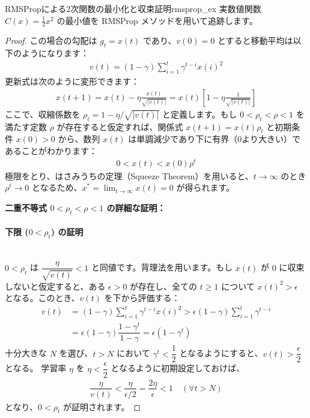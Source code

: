 \documentclass[dvipdfmx,a4paper,11pt]{jsarticle}
\begin{document}
\begin{reidai}{RMSPropによる2次関数の最小化と収束証明}{rmsprop_ex}
実数値関数 $C(x) = \frac{1}{2}x^2$ の最小値を RMSProp メソッドを用いて追跡します。
\end{reidai}
\begin{proof}
この場合の勾配は $g_t = x(t)$ であり、$v(0) = 0$ とすると移動平均は以下のようになります：
\begin{align*}
    v(t) = (1 - \gamma) \sum_{i=1}^t \gamma^{t-i}x(i)^2
\end{align*}
更新式は次のように変形できます：
\begin{align*}
    x(t + 1) = x(t) - \eta \frac{x(t)}{\sqrt{|v(t)|}} = x(t)\left[1 - \eta \frac{1}{\sqrt{|v(t)|}}\right]
\end{align*}
ここで、収縮係数を $\rho_t = 1 - \eta / \sqrt{|v(t)|}$ と定義します。もし $0 < \rho_t < \rho < 1$ を満たす定数 $\rho$ が存在すると仮定すれば、関係式 $x(t+1) = x(t)\rho_t$ と初期条件 $x(0) > 0$ から、数列 $x(t)$ は単調減少であり下に有界（0より大きい）であることがわかります：
\begin{align*}
    0 < x(t) < x(0)\rho^t
\end{align*}
極限をとり、はさみうちの定理（Squeeze Theorem）を用いると、$t \to \infty$ のとき $\rho^t \to 0$ となるため、$x^* = \lim_{t\to\infty} x(t) = 0$ が得られます。

\textbf{二重不等式 $0 < \rho_t < \rho < 1$ の詳細な証明：}

\paragraph{下限 ($0 < \rho_t$) の証明}\ \\
$0 < \rho_t$ は $\dfrac{\eta}{\sqrt{v(t)}} < 1$ と同値です。背理法を用います。もし $x(t)$ が $0$ に収束しないと仮定すると、ある $\epsilon > 0$ が存在し、全ての $t \ge 1$ について $x(t)^2 > \epsilon$ となる。このとき、$v(t)$ を下から評価する：
\begin{align*}
    v(t) &= (1 - \gamma) \sum_{i=1}^t \gamma^{t-i}x(i)^2 > \epsilon(1 - \gamma)\sum_{i=1}^t \gamma^{t-i} \\
         &= \epsilon(1 - \gamma)\dfrac{1 - \gamma^t}{1 - \gamma} = \epsilon(1 - \gamma^t)
\end{align*}
十分大きな $N$ を選び、$t > N$ において $\gamma^t < \dfrac{1}{2}$ となるようにすると、$v(t) > \dfrac{\epsilon}{2}$ となる。
学習率 $\eta$ を $\eta < \dfrac{\epsilon}{2}$ となるように初期設定しておけば、
\begin{align*}
    \dfrac{\eta}{v(t)} < \dfrac{\eta}{\epsilon/2} = \dfrac{2\eta}{\epsilon} < 1 \quad (\forall t > N)
\end{align*}
となり、$0 < \rho_t$ が証明されます。


\end{proof}
\end{document}
